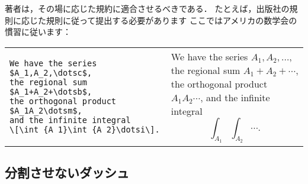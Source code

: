著者は，その場に応じた規約に適合させるべきである．
たとえば，出版社の規則に応じた規則に従って提出する必要があります
ここではアメリカの数学会の慣習に従います：
\begin{center}
\vspace{-\topsep}
\begin{tabular}{@{}ll@{}}
\begin{minipage}[t]{.50\textwidth}
\small
\begin{verbatim}
We have the series $A_1,A_2,\dotsc$,
the regional sum $A_1+A_2+\dotsb$,
the orthogonal product $A_1A_2\dotsm$,
and the infinite integral
\[\int_{A_1}\int_{A_2}\dotsi\].
\end{verbatim}
\end{minipage}
&
\begin{minipage}[t]{.48\textwidth}
\noindent
We have the series $A_1,A_2,\dotsc$,
the regional sum $A_1+A_2+\dotsb$,
the orthogonal product $A_1A_2\dotsm$,
and the infinite integral
\[\int_{A_1}\int_{A_2}\dotsi.\]
\end{minipage}
\end{tabular}
\end{center}

\subsection{分割させないダッシュ}

